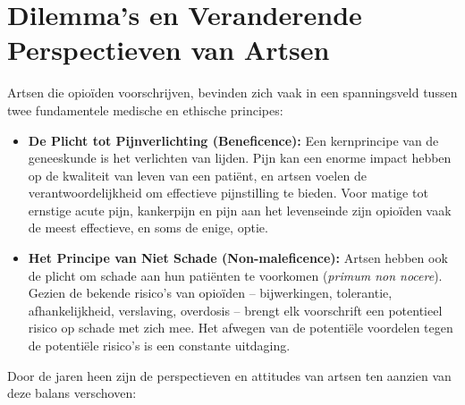 \documentclass[11pt, a4paper]{report} %
\begin{document}
\section{Dilemma's en Veranderende Perspectieven van Artsen}
Artsen die opioïden voorschrijven, bevinden zich vaak in een spanningsveld tussen twee fundamentele medische en ethische principes:
\begin{itemize}
    \item \textbf{De Plicht tot Pijnverlichting (Beneficence):} Een kernprincipe van de geneeskunde is het verlichten van lijden. Pijn kan een enorme impact hebben op de kwaliteit van leven van een patiënt, en artsen voelen de verantwoordelijkheid om effectieve pijnstilling te bieden. Voor matige tot ernstige acute pijn, kankerpijn en pijn aan het levenseinde zijn opioïden vaak de meest effectieve, en soms de enige, optie.
    \item \textbf{Het Principe van Niet Schade (Non-maleficence):} Artsen hebben ook de plicht om schade aan hun patiënten te voorkomen (\textit{primum non nocere}). Gezien de bekende risico's van opioïden – bijwerkingen, tolerantie, afhankelijkheid, verslaving, overdosis – brengt elk voorschrift een potentieel risico op schade met zich mee. Het afwegen van de potentiële voordelen tegen de potentiële risico's is een constante uitdaging.
\end{itemize}
Door de jaren heen zijn de perspectieven en attitudes van artsen ten aanzien van deze balans verschoven:
\end{document}
